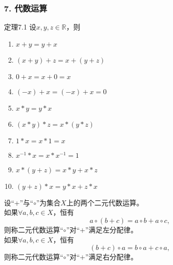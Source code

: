 \documentclass{beamer}
\begin{document}
\begin{CJK*}{UTF8}{gbsn}
\begin{frame}
  \frametitle{7. 代数运算}
  \begin{minipage}[t]{0.49\linewidth}
  \begin{block}{定理7.1}
    设$x, y, z \in \mathbb{R}$，则
   \begin{enumerate}
   \item   $x + y = y + x$
   \item   $(x + y) + z = x + (y + z)$
   \item   $0 + x = x + 0 = x$
   \item   $(-x) + x = (-x) + x = 0$
   \item   $x * y = y * x$
   \item   $(x * y) * z = x * (y *z)$
   \item   $1 * x = x * 1 = x$
   \item   $x^{-1} * x = x * x^{-1} = 1$
   \item   $x* (y + z) = x * y + x * z$
   \item   $(y + z) * x = y * x + z * x$
    \end{enumerate}
  \end{block}\pause
\end{minipage}
\begin{minipage}[t]{0.49\linewidth}
  \begin{Def}
    设“+”与“$\circ$”为集合$X$上的两个二元代数运算。\\如果$\forall a, b, c \in X$，恒有\[a \circ (b + c) = a \circ b + a \circ c,\] 则称二元代数运算“$\circ$”对“$+$”满足\alert{左分配律}。
    \\如果$\forall a, b, c \in X$，恒有\[(b + c)\circ a = b \circ a + c \circ a,\] 则称二元代数运算“$\circ$”对“$+$”满足\alert{右分配律}。
  \end{Def}
\end{minipage}
\end{frame}


\end{CJK*}
\end{document}
